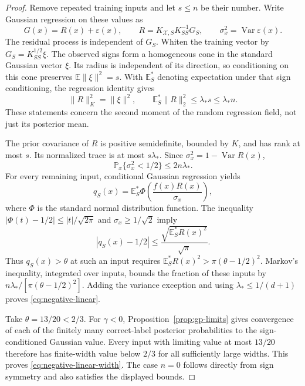 \begin{proof}
Remove repeated training inputs and let $s\le n$ be their number.
Write Gaussian regression on these values as
\[
 G(x)=R(x)+\varepsilon(x),\qquad
 R=K_{\mathcal X,S}K_{SS}^{-1}G_S,
 \qquad\sigma_x^2=\operatorname{Var}\varepsilon(x).
\]
The residual process is independent of $G_S$. Whiten the training
vector by $G_S=K_{SS}^{1/2}\xi$. The observed signs form a
homogeneous cone in the standard Gaussian vector $\xi$. Its radius
is independent of its direction, so conditioning on this cone
preserves $\mathbb E\|\xi\|^2=s$. With $\mathbb E_S^*$ denoting
expectation under that sign conditioning, the regression identity gives
\[
 \|R\|_K^2=\|\xi\|^2,\qquad
 \mathbb E_S^*\|R\|_2^2\le\lambda_*s\le\lambda_*n.
\]
These statements concern the second moment of the random regression
field, not just its posterior mean.

The prior covariance of $R$ is positive semidefinite, bounded by
$K$, and has rank at most $s$. Its normalized trace is at most
$s\lambda_*$. Since $\sigma_x^2=1-\operatorname{Var}R(x)$,
\[
 \mathbb P_x\{\sigma_x^2<1/2\}\le2n\lambda_*.
\]
For every remaining input, conditional Gaussian regression yields
\[
 q_S(x)=\mathbb E_S^*\Phi\!\left(\frac{f(x)R(x)}{\sigma_x}\right),
\]
where $\Phi$ is the standard normal distribution function. The
inequality $|\Phi(t)-1/2|\le |t|/\sqrt{2\pi}$ and
$\sigma_x\ge1/\sqrt2$ imply
\[
 |q_S(x)-1/2|
 \le\frac{\sqrt{\mathbb E_S^*R(x)^2}}{\sqrt\pi}.
\]
Thus $q_S(x)>\theta$ at such an input requires
$\mathbb E_S^*R(x)^2>\pi(\theta-1/2)^2$. Markov's inequality,
integrated over inputs, bounds the fraction of these inputs by
$n\lambda_*/[\pi(\theta-1/2)^2]$. Adding the variance exception
and using $\lambda_*\le1/(d+1)$ proves
\eqref{eq:negative-linear}.

Take $\theta=13/20<2/3$. For $\gamma<0$,
Proposition~\ref{prop:gp-limits} gives convergence of each of the
finitely many correct-label posterior probabilities to the
sign-conditioned Gaussian value. Every input with limiting value
at most $13/20$ therefore has finite-width value below $2/3$ for all
sufficiently large widths. This proves
\eqref{eq:negative-linear-width}. The case $n=0$ follows directly
from sign symmetry and also satisfies the displayed bounds.
\end{proof}

